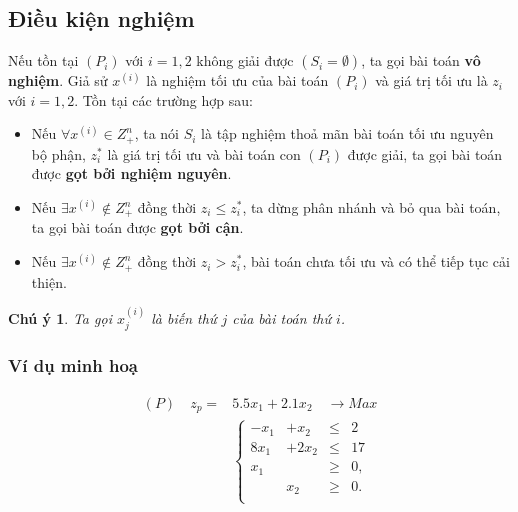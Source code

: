 \documentclass[12pt,a4paper]{report}
\newtheorem{cy}{Chú ý}
\begin{document}
\subsection*{Điều kiện nghiệm}
Nếu tồn tại $(P_i)$ với $i=1,2$ không giải được $(S_i = \emptyset )$, ta gọi bài toán \textbf{vô nghiệm}. Giả sử $x^{(i)}$ là nghiệm tối ưu của bài toán $(P_i)$ và giá trị tối ưu là $z_i$ với $i = 1,2$. Tồn tại các trường hợp sau:
\begin{itemize}
\item Nếu $\forall x^{(i)} \in Z^n_+$, ta nói $S_i$ là tập nghiệm thoả mãn bài toán tối ưu nguyên bộ phận, $z^*_i$ là giá trị tối ưu và bài toán con $(P_i)$ được giải, ta gọi bài toán được \textbf{gọt bởi nghiệm nguyên}.
\item Nếu $\exists x^{(i)} \notin Z^n_+$ đồng thời $z_i \leq z^*_i$, ta dừng phân nhánh và bỏ qua bài toán, ta gọi bài toán được \textbf{gọt bởi cận}.
\item Nếu $\exists x^{(i)} \notin Z^n_+$ đồng thời $z_i > z^*_i$, bài toán chưa tối ưu và có thể tiếp tục cải thiện.

\end{itemize}

\begin{cy}
Ta gọi $x_j^{(i)}$ là biến thứ $j$ của bài toán thứ $i$.
\end{cy}

\subsubsection*{Ví dụ minh hoạ}
    \begin{equation*}
        \begin{split}
            (P) \quad z_p= & 5.5x_1 + 2.1x_2 \quad \longrightarrow Max \\
            & \left\{\begin{array}{cccc}
            -x_1 &+ x_2 &\leq& 2 \\
            8x_1 &+ 2x_2 &\leq& 17 \\
            x_1 &&\geq& 0, \\
            &x_2 &\geq& 0. \\
            \end{array}\right. \\
        \end{split}
    \end{equation*}
\end{document}
